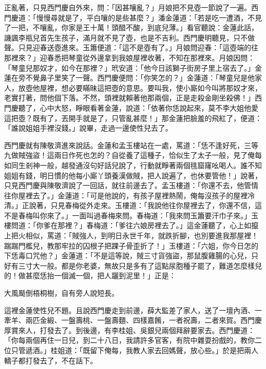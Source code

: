 正亂著，只見西門慶自外來，問：「因甚嚷亂？」月娘把不見壺一節說了一遍。西門慶道：「慢慢尋就是了，平白嚷的是些甚麼？」潘金蓮道：「若是吃一遭酒，不見了一把，不嚷亂，你家是王十萬！頭醋不酸，到底兒薄。」看官聽說：金蓮此話，譏諷李瓶兒首先生孩子，滿月就不見了壺，也是不吉利。西門慶明聽見，只不做聲。只見迎春送壺進來。玉簫便道：「這不是壺有了。」月娘問迎春：「這壺端的往那裡來？」迎春悉把琴童從外邊拿到我娘屋裡收著，不知在那裡來。月娘因問： 「琴童兒那奴才，如今在那裡？」玳安道：「他今日該獅子街房子里上宿去了。」金蓮在旁不覺鼻子里笑了一聲。西門慶便問：「你笑怎的？」金蓮道：「琴童兒是他家人，放壺他屋裡，想必要瞞昧這把壺的意思。要叫我，使小廝如今叫將那奴才來，老實打著，問他個下落。不然，頭裡就賴著他那兩個，正是走殺金剛坐殺佛！」西門慶聽了，心中大怒，睜眼看著金蓮，說道：「依著你恁說起來，莫不李大姐他愛這把壺？既有了，丟開手就是了，只管亂甚麼！」那金蓮把臉羞的飛紅了，便道：「誰說姐姐手裡沒錢。」說畢，走過一邊使性兒去了。

西門慶就有陳敬濟進來說話。金蓮和孟玉樓站在一處，罵道：「恁不逢好死，三等九做賊強盜！這兩日作死也怎的？自從養了這種子，恰似生了太子一般，見了俺每如同生剎神一般，越發通沒句好話兒說了，行動就睜著兩個毴窟窿吆喝人。誰不知姐姐有錢，明日慣的他每小廝丫頭養漢做賊，把人說遍了，也休要管他！」說著，只見西門慶與陳敬濟說了一回話，就往前邊去了。孟玉樓道：「你還不去，他管情往你屋裡去了。」金蓮道：「可是他說的，有孩子屋裡熱鬧，俺每沒孩子的屋裡冷清。」正說著，只見春梅從外走來。玉樓道：「我說他往你屋裡去了，你還不信，這不是春梅叫你來了。」一面叫過春梅來問。春梅道：「我來問玉簫要汗巾子來。」玉樓問道：「你爹在那裡？」春梅道：「爹往六娘房裡去了。」這金蓮聽了，心上如攛上把火相似，罵道：「賊強人，到明日永世千年，就跌折腳，也別要進我那屋裡！踹踹門檻兒，教那牢拉的囚根子把踝子骨歪折了！」玉樓道：「六姐，你今日怎的下恁毒口咒他？」金蓮道：「不是這等說，賊三寸貨強盜，那鼠腹雞腸的心兒，只好有三寸大一般。都是你老婆，無故只是多有了這點尿胞種子罷了，難道怎麼樣兒的！做甚麼恁抬一個滅一個，把人躧到泥里！」正是：

大風颳倒梧桐樹，自有旁人說短長。

這裡金蓮使性兒不題。且說西門慶走到前邊，薛大監差了家人，送了一壇內酒、一牽羊、兩匹金緞、一盤壽桃、一盤壽麵、四樣嘉餚，一者祝壽，二者來賀。西門慶厚賞來人，打發去了。到後邊，有李桂姐、吳銀兒兩個拜辭要家去。西門慶道：「你每兩個再住一日兒，到二十八日，我請許多官客，有院中雜耍扮戲的，教你二位只管遞酒。」桂姐道：「既留下俺每，我教人家去回媽聲，放心些。」於是把兩人轎子都打發去了，不在話下。

